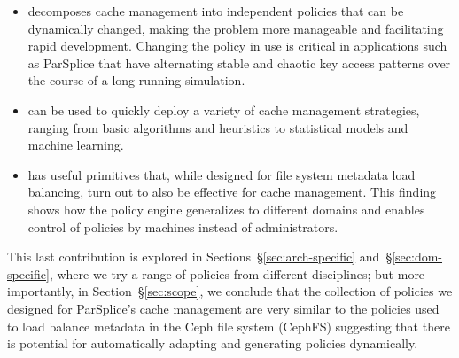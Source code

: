 \begin{itemize}

  \item decomposes cache management into independent policies that can be
  dynamically changed, making the problem more manageable and facilitating rapid
  development. Changing the policy in use is critical in applications such as
  ParSplice that have alternating stable and chaotic key access patterns
  over the course of a long-running simulation.  

  \item can be used to quickly deploy a variety of cache management strategies,
  ranging from basic algorithms and heuristics to statistical models and machine
  learning. 

  \item has useful primitives that, while designed for file system metadata
  load balancing, turn out to also be effective for cache management. This
  finding shows how the policy engine generalizes to different domains and
  enables control of policies by machines instead of administrators.

\end{itemize}


This last contribution is explored in Sections~\S\ref{sec:arch-specific}
and~\S\ref{sec:dom-specific}, where we try a range of policies from different
disciplines; but more importantly, in Section~\S\ref{sec:scope}, we conclude
that the collection of policies we designed for ParSplice's cache management
are very similar to the policies used to load balance metadata in the Ceph file
system (CephFS) suggesting that there is potential for automatically adapting
and generating policies dynamically. 


